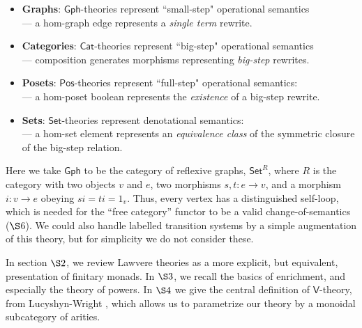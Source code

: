 \documentclass{amsart}
\theoremstyle{definition}
\newcommand{\Gph}{\mathsf{Gph}}
\newcommand{\Set}{\mathsf{Set}}
\newcommand{\Cat}{\mathsf{Cat}}
\newcommand{\Pos}{\mathsf{Pos}}
\newcommand{\V}{\mathsf{V}}
\newcommand{\maps}{\colon}
\begin{document}
\begin{itemize}
\item 
\textbf{Graphs}: $\Gph$-theories represent ``small-step" operational semantics \\ --- a hom-graph edge represents a \textit{single term} rewrite.
\item
\textbf{Categories}: $\Cat$-theories represent ``big-step" operational semantics\\ --- composition 
generates morphisms representing \textit{big-step} rewrites.
\item
\textbf{Posets}: $\Pos$-theories represent ``full-step" operational semantics:\\ --- a hom-poset boolean represents the \textit{existence} of a big-step rewrite.
\item
\textbf{Sets}: $\Set$-theories represent denotational semantics: \\ --- a hom-set element represents an \textit{equivalence class} of the symmetric closure of the big-step relation.
\end{itemize}
Here we take $\Gph$ to be the category of reflexive graphs, $\Set^R$, where $R$ is the category with two objects $v$ and $e$, two morphisms $s,t \maps e \to v$, and a morphism $i \maps v \to e$ obeying $si = ti = 1_v$.  Thus, every vertex has a distinguished self-loop, which is needed for the ``free category'' functor to be a valid change-of-semantics ($\S$6).   We could also handle labelled transition systems by a simple augmentation of this theory, but for simplicity we do not consider these.


In section $\S2$, we review Lawvere theories as a more explicit, but equivalent, presentation of finitary monads. In $\S3$, we recall the basics of enrichment, and especially the theory of powers.  In $\S4$ we give the central definition of $\V$-theory, from Lucyshyn-Wright \cite{lucyshyn-wright}, which allows us to parametrize our theory by a monoidal subcategory of arities.
\end{document}
